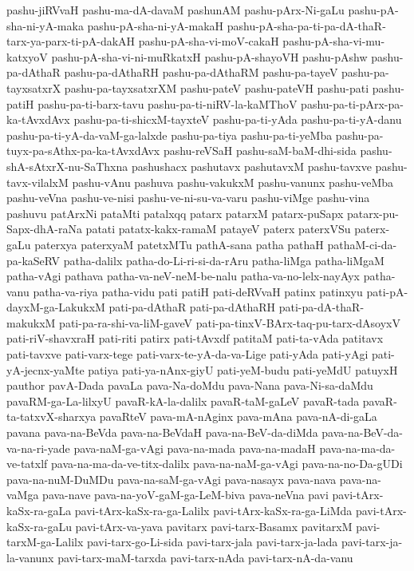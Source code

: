 {pashu-jiRVvaH
pashu-ma-dA-davaM
pashunAM
pashu-pArx-Ni-gaLu
pashu-pA-sha-ni-yA-maka
pashu-pA-sha-ni-yA-makaH
pashu-pA-sha-pa-ti-pa-dA-thaR-tarx-ya-parx-ti-pA-dakAH
pashu-pA-sha-vi-moV-cakaH
pashu-pA-sha-vi-mu-katxyoV
pashu-pA-sha-vi-ni-muRkatxH
pashu-pA-shayoVH
pashu-pAshw
pashu-pa-dAthaR
pashu-pa-dAthaRH
pashu-pa-dAthaRM
pashu-pa-tayeV
pashu-pa-tayxsatxrX
pashu-pa-tayxsatxrXM
pashu-pateV
pashu-pateVH
pashu-pati
pashu-patiH
pashu-pa-ti-barx-tavu
pashu-pa-ti-niRV-la-kaMThoV
pashu-pa-ti-pArx-pa-ka-tAvxdAvx
pashu-pa-ti-shicxM-tayxteV
pashu-pa-ti-yAda
pashu-pa-ti-yA-danu
pashu-pa-ti-yA-da-vaM-ga-lalxde
pashu-pa-tiya
pashu-pa-ti-yeMba
pashu-pa-tuyx-pa-sAthx-pa-ka-tAvxdAvx
pashu-reVSaH
pashu-saM-baM-dhi-sida
pashu-shA-sAtxrX-nu-SaThxna
pashushacx
pashutavx
pashutavxM
pashu-tavxve
pashu-tavx-vilalxM
pashu-vAnu
pashuva
pashu-vakukxM
pashu-vanunx
pashu-veMba
pashu-veVna
pashu-ve-nisi
pashu-ve-ni-su-va-varu
pashu-viMge
pashu-vina
pashuvu
patArxNi
pataMti
patalxqq
patarx
patarxM
patarx-puSapx
patarx-pu-Sapx-dhA-raNa
patati
patatx-kakx-ramaM
patayeV
paterx
paterxVSu
paterx-gaLu
paterxya
paterxyaM
patetxMTu
pathA-sana
patha
pathaH
pathaM-ci-da-pa-kaSeRV
patha-dalilx
patha-do-Li-ri-si-da-rAru
patha-liMga
patha-liMgaM
patha-vAgi
pathava
patha-va-neV-neM-be-nalu
patha-va-no-lelx-nayAyx
patha-vanu
patha-va-riya
patha-vidu
pati
patiH
pati-deRVvaH
patinx
patinxyu
pati-pA-dayxM-ga-LakukxM
pati-pa-dAthaR
pati-pa-dAthaRH
pati-pa-dA-thaR-makukxM
pati-pa-ra-shi-va-liM-gaveV
pati-pa-tinxV-BArx-taq-pu-tarx-dAsoyxV
pati-riV-shavxraH
pati-riti
patirx
pati-tAvxdf
patitaM
pati-ta-vAda
patitavx
pati-tavxve
pati-varx-tege
pati-varx-te-yA-da-va-Lige
pati-yAda
pati-yAgi
pati-yA-jecnx-yaMte
patiya
pati-ya-nAnx-giyU
pati-yeM-budu
pati-yeMdU
patuyxH
pauthor
pavA-Dada
pavaLa
pava-Na-doMdu
pava-Nana
pava-Ni-sa-daMdu
pavaRM-ga-La-lilxyU
pavaR-kA-la-dalilx
pavaR-taM-gaLeV
pavaR-tada
pavaR-ta-tatxvX-sharxya
pavaRteV
pava-mA-nAginx
pava-mAna
pava-nA-di-gaLa
pavana
pava-na-BeVda
pava-na-BeVdaH
pava-na-BeV-da-diMda
pava-na-BeV-da-va-na-ri-yade
pava-naM-ga-vAgi
pava-na-mada
pava-na-madaH
pava-na-ma-da-ve-tatxlf
pava-na-ma-da-ve-titx-dalilx
pava-na-naM-ga-vAgi
pava-na-no-Da-gUDi
pava-na-nuM-DuMDu
pava-na-saM-ga-vAgi
pava-nasayx
pava-nava
pava-na-vaMga
pava-nave
pava-na-yoV-gaM-ga-LeM-biva
pava-neVna
pavi
pavi-tArx-kaSx-ra-gaLa
pavi-tArx-kaSx-ra-ga-Lalilx
pavi-tArx-kaSx-ra-ga-LiMda
pavi-tArx-kaSx-ra-gaLu
pavi-tArx-va-yava
pavitarx
pavi-tarx-Basamx
pavitarxM
pavi-tarxM-ga-Lalilx
pavi-tarx-go-Li-sida
pavi-tarx-jala
pavi-tarx-ja-lada
pavi-tarx-ja-la-vanunx
pavi-tarx-maM-tarxda
pavi-tarx-nAda
pavi-tarx-nA-da-vanu
}
